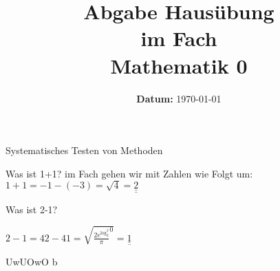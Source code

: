\documentclass[ngerman]{Tuda_Hausuebung}
\date{\textbf{\sffamily Datum:} \today} %
\begin{document}
\title[Mathe 0]{Abgabe Hausübung\\im Fach\\ Mathematik 0}
\maketitle{}
\printGradeTable{}

\begin{task}[points=8,solution=true]{\mdseries Systematisches Testen von Methoden}
    \begin{cpenumerate}[label=\alph*)]
        \item Was ist 1+1?
        im Fach \getShortTitle{} gehen wir mit Zahlen wie Folgt um:
        $1+1=-1-(-3)=\sqrt{4}=\underline{\underline{2}}$
        \item Was ist 2-1?

        $2-1=42-41=\sqrt{\frac{2e^{\log_{2}^3}}{\pi}^{0}}=\underline{\underline{1}}$

    \end{cpenumerate}
\end{task}
\begin{task}[points=2,solution=true]{UwUOwO}
    b
\end{task}
\clearpage
\end{document}
